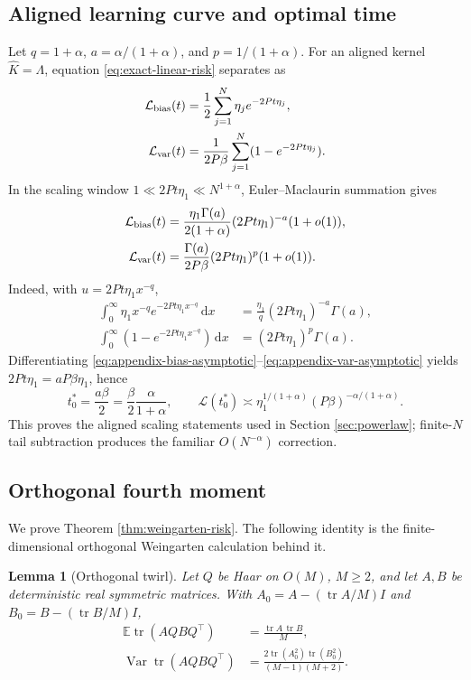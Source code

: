 \documentclass{article}
\newtheorem{lemma}[theorem]{Lemma}
\newcommand{\E}{\mathbb E}
\newcommand{\Var}{\operatorname{Var}}
\newcommand{\tr}{\operatorname{tr}}
\newcommand{\wh}{\widehat}
\newcommand{\dd}{\mathrm d}
\begin{document}
\subsection{Aligned learning curve and optimal time}
Let \(q=1+\alpha\), \(a=\alpha/(1+\alpha)\), and
\(p=1/(1+\alpha)\).  For an aligned kernel \(\wh K=\Lambda\), equation \eqref{eq:exact-linear-risk} separates as
\begin{align}
\mathcal L_{\rm bias}(t)
&=\frac12\sum_{j=1}^N\eta_j e^{-2Pt\eta_j},
\label{eq:appendix-aligned-bias}\\
\mathcal L_{\rm var}(t)
&=\frac1{2P\beta}\sum_{j=1}^N(1-e^{-2Pt\eta_j}).
\label{eq:appendix-aligned-var}
\end{align}
In the scaling window \(1\ll2Pt\eta_1\ll N^{1+\alpha}\), Euler--Maclaurin summation gives
\begin{align}
\mathcal L_{\rm bias}(t)
&=\frac{\eta_1\Gamma(a)}{2(1+\alpha)}
(2Pt\eta_1)^{-a}(1+o(1)),
\label{eq:appendix-bias-asymptotic}\\
\mathcal L_{\rm var}(t)
&=\frac{\Gamma(a)}{2P\beta}
(2Pt\eta_1)^p(1+o(1)).
\label{eq:appendix-var-asymptotic}
\end{align}
Indeed, with \(u=2Pt\eta_1x^{-q}\),
\begin{align}
\int_0^\infty \eta_1x^{-q}e^{-2Pt\eta_1x^{-q}}\,\dd x
&=\frac{\eta_1}{q}(2Pt\eta_1)^{-a}\Gamma(a),\\
\int_0^\infty(1-e^{-2Pt\eta_1x^{-q}})\,\dd x
&=(2Pt\eta_1)^p\Gamma(a).
\end{align}
Differentiating \eqref{eq:appendix-bias-asymptotic}--\eqref{eq:appendix-var-asymptotic} yields
\(2Pt\eta_1=aP\beta\eta_1\), hence
\begin{equation}
t_0^*=\frac{a\beta}{2}
=\frac{\beta}{2}\frac{\alpha}{1+\alpha},
\qquad
\mathcal L(t_0^*)\asymp
\eta_1^{1/(1+\alpha)}(P\beta)^{-\alpha/(1+\alpha)}.
\label{eq:appendix-aligned-optimum}
\end{equation}
This proves the aligned scaling statements used in Section \ref{sec:powerlaw}; finite-\(N\) tail subtraction produces the familiar \(O(N^{-\alpha})\) correction.

\subsection{Orthogonal fourth moment}
We prove Theorem \ref{thm:weingarten-risk}.  The following identity is the finite-dimensional orthogonal Weingarten calculation behind it.

\begin{lemma}[Orthogonal twirl]
\label{lem:orthogonal-twirl}
Let \(Q\) be Haar on \(O(M)\), \(M\ge2\), and let \(A,B\) be deterministic real symmetric matrices.  With
\(A_0=A-(\tr A/M)I\) and \(B_0=B-(\tr B/M)I\),
\begin{align}
\E\tr(AQBQ^\top)&=\frac{\tr A\,\tr B}{M},
\label{eq:appendix-twirl-mean}\\
\Var\tr(AQBQ^\top)&=
\frac{2\tr(A_0^2)\tr(B_0^2)}{(M-1)(M+2)}.
\label{eq:appendix-twirl-var}
\end{align}
\end{lemma}
\end{document}
